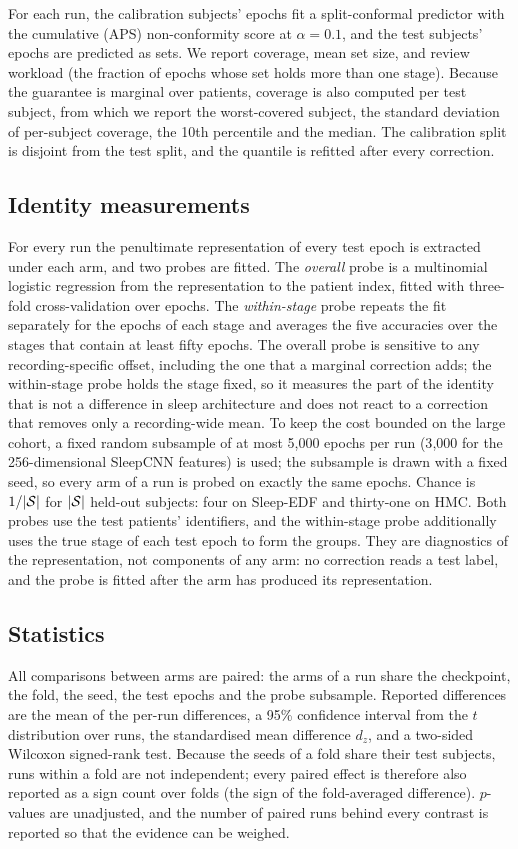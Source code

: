 For each run, the calibration subjects' epochs fit a split-conformal predictor
with the cumulative (APS) non-conformity score \citep{romano2020} at
$\alpha=0.1$, and the test subjects' epochs are predicted as sets. We report
coverage, mean set size, and review workload (the fraction of epochs whose set
holds more than one stage). Because the guarantee is marginal over patients,
coverage is also computed per test subject, from which we report the
worst-covered subject, the standard deviation of per-subject coverage, the
10th percentile and the median. The calibration split is disjoint from the test
split, and the quantile is refitted after every correction.

\subsection{Identity measurements}

For every run the penultimate representation of every test epoch is extracted
under each arm, and two probes are fitted. The \emph{overall} probe is a
multinomial logistic regression from the representation to the patient index,
fitted with three-fold cross-validation over epochs. The \emph{within-stage}
probe repeats the fit separately for the epochs of each stage and averages the
five accuracies over the stages that contain at least fifty epochs. The overall
probe is sensitive to any recording-specific offset, including the one that a
marginal correction adds; the within-stage probe holds the stage fixed, so it
measures the part of the identity that is not a difference in sleep
architecture and does not react to a correction that removes only a
recording-wide mean. To keep the cost bounded on the large cohort, a fixed
random subsample of at most 5{,}000 epochs per run (3{,}000 for the
256-dimensional SleepCNN features) is used; the subsample is drawn with a fixed
seed, so every arm of a run is probed on exactly the same epochs. Chance is
$1/|\mathcal{S}|$ for $|\mathcal{S}|$ held-out subjects: four on Sleep-EDF and thirty-one on
HMC. Both probes use the test patients' identifiers, and the within-stage
probe additionally uses the true stage of each test epoch to form the groups.
They are diagnostics of the representation, not components of any arm: no
correction reads a test label, and the probe is fitted after the arm has
produced its representation.

\subsection{Statistics}

All comparisons between arms are paired: the arms of a run share the
checkpoint, the fold, the seed, the test epochs and the probe subsample.
Reported differences are the mean of the per-run differences, a 95\% confidence
interval from the $t$ distribution over runs, the standardised mean difference
$d_z$, and a two-sided Wilcoxon signed-rank test. Because the seeds of a fold
share their test subjects, runs within a fold are not independent; every paired
effect is therefore also reported as a sign count over folds (the sign of the
fold-averaged difference). $p$-values are unadjusted, and the number of paired
runs behind every contrast is reported so that the evidence can be weighed.
